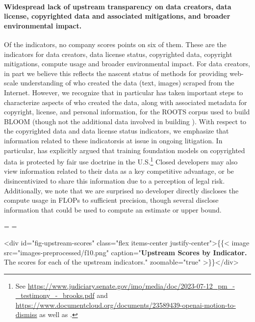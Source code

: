 \documentclass[screen, authorversion, acmsmall]{acmart}
\begin{document}
\paragraph{Widespread lack of upstream transparency on data creators, data license, copyrighted data and associated mitigations, and broader environmental impact.} 
Of the \numupstreamindicators indicators, no company scores points on six of them.
These are the indicators for data creators, data license status, copyrighted data, copyright mitigations, compute usage and broader environmental impact.
For data creators, in part we believe this reflects the nascent status of methods for providing web-scale understanding of who created the data (\eg text, images) scraped from the Internet. 
However, we recognize that \huggingface in particular has taken important steps to characterize aspects of who created the data, along with associated metadata for copyright, license, and personal information, for the ROOTS corpus used to build BLOOM (though not the additional data involved in building \bloomz). 
With respect to the copyrighted data and data license status indicators, we emphasize that information related to these indicatorsis at issue in ongoing litigation. 
In particular, \stability has explicitly argued that training foundation models on copyrighted data is protected by fair use doctrine in the U.S.\footnote{See \url{https://www.judiciary.senate.gov/imo/media/doc/2023-07-12_pm_-_testimony_-_brooks.pdf} and \url{https://www.documentcloud.org/documents/23589439-openai-motion-to-dismiss} as well as \citet{lemley2020fair}.} 
Closed developers may also view information related to their data as a key competitive advantage, or be disincentivized to share this information due to a perception of legal risk.
Additionally, we note that we are surprised no developer directly discloses the compute usage in FLOPs to sufficient precision, though several disclose information that could be used to compute an estimate or upper bound. 

\edef\originalwidth{\the\pdfpagewidth}
\edef\originalheight{\the\pdfpageheight}




\eject
\pdfpageheight=\originalwidth
\newlength{\mylength}
\setlength{\mylength}{\originalheight-3.4cm}
\pdfpagewidth=\mylength
{}

<div id="fig-upstream-scores" class="flex items-center justify-center">\{\{< image src="images-preprocessed/f10.png" caption="\textbf{Upstream Scores by Indicator.} The scores for each of the \numupstreamindicators upstream indicators." zoomable="true" >\}\}</div>
\end{document}
